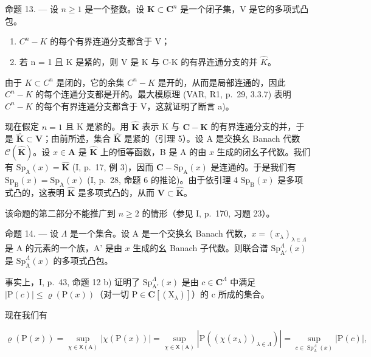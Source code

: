命题 13. --- 设 \(n \geqslant 1\) 是一个整数。设 \(\mathbf{K} \subset \mathbf{C}^{n}\) 是一个闭子集，V 是它的多项式凸包。

\begin{enumerate}
\def\labelenumi{\alph{enumi})}
\item
  \(C^{n} - K\) 的每个有界连通分支都含于 V；
\item
  若 n = 1 且 K 是紧的，则 V 是 K 与 C-K 的有界连通分支的并 \(\widehat{K}\)。
\end{enumerate}

由于 \(K \subset C^{n}\) 是闭的，它的余集 \(C^{n}-K\) 是开的，从而是局部连通的，因此 \(C^{n}-K\) 的每个连通分支都是开的。最大模原理 (VAR, R1, p.~29, 3.3.7) 表明 \(C^{n}-K\) 的每个有界连通分支都含于 V，这就证明了断言 a)。

现在假定 \(n = 1\) 且 K 是紧的。用 \(\widehat{\mathbf{K}}\) 表示 K 与 \(\mathbf{C} - \mathbf{K}\) 的有界连通分支的并，于是 \(\widehat{\mathbf{K}} \subset \mathbf{V}\)；由前所述，集合 \(\widehat{\mathbf{K}}\) 是紧的（引理 5）。设 A 是交换幺 Banach 代数 \(\mathcal{C}(\widehat{\mathbf{K}})\)。设 \(x \in \mathbf{A}\) 是 \(\widehat{\mathbf{K}}\) 上的恒等函数，B 是 A 的由 \(x\) 生成的闭幺子代数。我们有 \(\mathrm{Sp}_{\mathrm{A}}(x) = \widehat{\mathbf{K}}\) (I, p.~17, 例 3)，因而 \(\mathbf{C} - \mathrm{Sp}_{\mathrm{A}}(x)\) 是连通的。于是我们有 \(\mathrm{Sp}_{\mathrm{B}}(x) = \mathrm{Sp}_{\mathrm{A}}(x)\) (I, p.~28, 命题 6 的推论)。由于依引理 4 \(\mathrm{Sp}_{\mathrm{B}}(x)\) 是多项式凸的，这表明 \(\widehat{\mathbf{K}}\) 是多项式凸的，从而 \(\mathbf{V} \subset \widehat{\mathbf{K}}\)。

该命题的第二部分不能推广到 \(n \geqslant 2\) 的情形（参见 I, p.~170, 习题 23）。

命题 14. --- 设 \(\Lambda\) 是一个集合。设 A 是一个交换幺 Banach 代数，\(x = (x_{\lambda})_{\lambda \in \Lambda}\) 是 A 的元素的一个族，A' 是由 \(x\) 生成的幺 Banach 子代数。则联合谱 \(\mathrm{Sp}_{\mathrm{A}'}^{\Lambda}(x)\) 是 \(\mathrm{Sp}_{\mathrm{A}}^{\Lambda}(x)\) 的多项式凸包。

事实上，I, p.~43, 命题 12 b) 证明了 \(\mathrm{Sp}_{\mathrm{A}'}^{\Lambda}(x)\) 是由 \(c \in \mathbf{C}^{\Lambda}\) 中满足 \(|\mathrm{P}(c)| \leqslant \varrho(\mathrm{P}(x))\)（对一切 \(\mathrm{P} \in \mathbf{C}[(\mathrm{X}_{\lambda})]\)）的 c 所成的集合。

现在我们有

\[
\varrho (\mathrm{P} (x)) = \sup _ {\chi \in \mathsf {X} (\mathrm{A})} | \chi (\mathrm{P} (x)) | = \sup _ {\chi \in \mathsf {X} (\mathrm{A})} | \mathrm{P} ((\chi (x _ {\lambda})) _ {\lambda \in \Lambda}) | = \sup _ {c \in \operatorname{Sp} _ {\mathrm{A}} ^ {\Lambda} (x)} | \mathrm{P} (c) |,
\]


